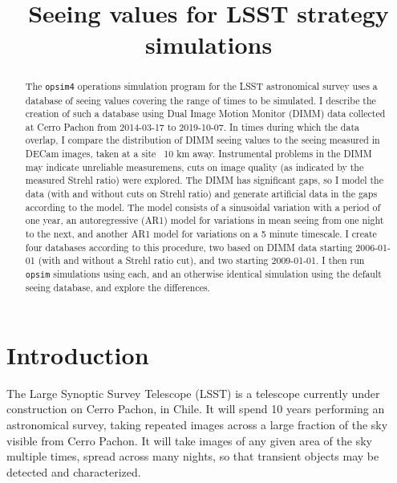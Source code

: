 \documentclass[\docopts]{\docclass}
\begin{document}

\title{Seeing values for LSST strategy simulations}

\maketitlepre

\begin{abstract}

The \texttt{opsim4} operations simulation program for the LSST
astronomical survey uses a database of seeing values covering the
range of times to be simulated. I describe the creation of such a
database using Dual Image Motion Monitor (DIMM) data collected at
Cerro Pachon from 2014-03-17 to 2019-10-07. In times during which the
data overlap, I compare the distribution of DIMM seeing values to the
seeing measured in DECam images, taken at a site ~10 km
away. Instrumental problems in the DIMM may indicate unreliable
measuremens, cuts on image quality (as indicated by the measured
Strehl ratio) were explored. The DIMM has significant gaps, so I model
the data (with and without cuts on Strehl ratio) and generate
artificial data in the gaps according to the model. The model consists
of a sinusoidal variation with a period of one year, an autoregressive
(AR1) model for variations in mean seeing from one night to the next,
and another AR1 model for variations on a 5 minute timescale. I create
four databases according to this procedure, two based on DIMM data
starting 2006-01-01 (with and without a Strehl ratio cut), and two
starting 2009-01-01. I then run \texttt{opsim} simulations using each,
and an otherwise identical simulation using the default seeing
database, and explore the differences.
\end{abstract}

\dockeys{}

\maketitlepost


\section{Introduction}
\label{sec:intro}

The Large Synoptic Survey Telescope (LSST) is a telescope currently
under construction on Cerro Pachon, in Chile. It will spend 10 years
performing an astronomical survey, taking repeated images across a
large fraction of the sky visible from Cerro Pachon. It will take
images of any given area of the sky multiple times, spread across many
nights, so that transient objects may be detected and characterized.
\end{document}
